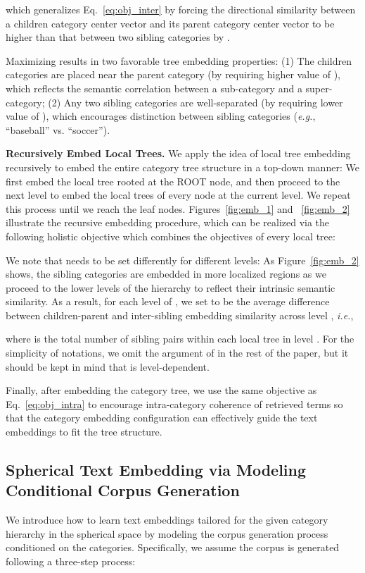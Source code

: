 \documentclass[sigconf]{acmart}
\newcommand{\ie}{\emph{i.e.}}
\newcommand{\eg}{\emph{e.g.}}
\theoremstyle{definition}
\begin{document}
which generalizes Eq.~\eqref{eq:obj_inter} by forcing the directional similarity between a children category center vector and its parent category center vector to be higher than that between two sibling categories by .

Maximizing  results in two favorable tree embedding properties: (1) The children categories are placed near the parent category (by requiring higher value of ), which reflects the semantic correlation between a sub-category and a super-category; (2) Any two sibling categories are well-separated (by requiring lower value of ), which encourages distinction between sibling categories (\eg, ``baseball'' vs. ``soccer'').

\noindent
\textbf{Recursively Embed Local Trees.}
We apply the idea of local tree embedding recursively to embed the entire category tree structure in a top-down manner: We first embed the local tree rooted at the ROOT node, and then proceed to the next level to embed the local trees of every node at the current level. We repeat this process until we reach the leaf nodes. Figures~\ref{fig:emb_1} and ~\ref{fig:emb_2} illustrate the recursive embedding procedure, which can be realized via the following holistic objective which combines the objectives of every local tree:


We note that  needs to be set differently for different levels: As Figure~\ref{fig:emb_2} shows, the sibling categories are embedded in more localized regions as we proceed to the lower levels of the hierarchy to reflect their intrinsic semantic similarity. As a result, for each level  of , we set  to be the average difference between children-parent and inter-sibling embedding similarity across level , \ie,

where  is the total number of sibling pairs within each local tree in level . For the simplicity of notations, we omit the argument of  in the rest of the paper, but it should be kept in mind that  is level-dependent.

Finally, after embedding the category tree, we use the same objective as Eq.~\eqref{eq:obj_intra} to encourage intra-category coherence of retrieved terms so that the category embedding configuration can effectively guide the text embeddings to fit the tree structure.

\subsection{Spherical Text Embedding via Modeling Conditional Corpus Generation}
\label{sec:text_emb}
We introduce how to learn text embeddings tailored for the given  category hierarchy  in the spherical space by modeling the corpus generation process conditioned on the categories. Specifically, we assume the corpus  is generated following a three-step process: 
\end{document}
